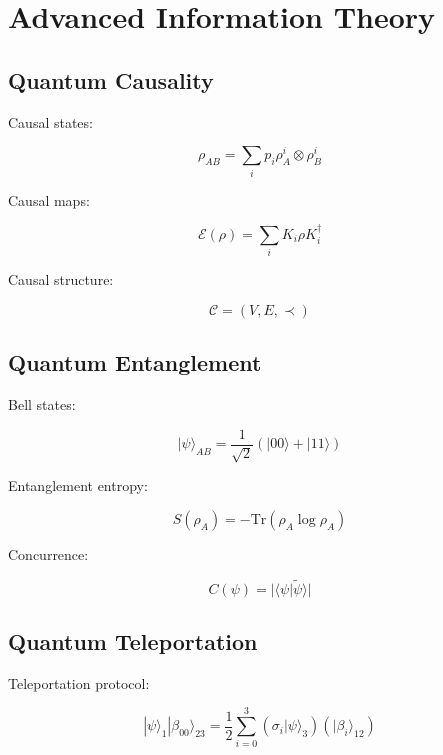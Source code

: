 \documentclass[12pt]{article}
\newcommand{\tr}{\text{Tr}}
\begin{document}
\section{Advanced Information Theory}

\subsection{Quantum Causality}

Causal states:

\begin{equation}
\rho_{AB} = \sum_i p_i \rho_A^i \otimes \rho_B^i
\end{equation}

Causal maps:

\begin{equation}
\mathcal{E}(\rho) = \sum_i K_i\rho K_i^\dagger
\end{equation}

Causal structure:

\begin{equation}
\mathcal{C} = (V,E,\prec)
\end{equation}

\subsection{Quantum Entanglement}

Bell states:

\begin{equation}
|\psi\rangle_{AB} = \frac{1}{\sqrt{2}}(|00\rangle + |11\rangle)
\end{equation}

Entanglement entropy:

\begin{equation}
S(\rho_A) = -\tr(\rho_A\log\rho_A)
\end{equation}

Concurrence:

\begin{equation}
C(\psi) = |\langle\psi|\tilde{\psi}\rangle|
\end{equation}

\subsection{Quantum Teleportation}

Teleportation protocol:

\begin{equation}
|\psi\rangle_1|\beta_{00}\rangle_{23} = \frac{1}{2}\sum_{i=0}^3 (\sigma_i|\psi\rangle_3)(|\beta_i\rangle_{12})
\end{equation}
\end{document}
